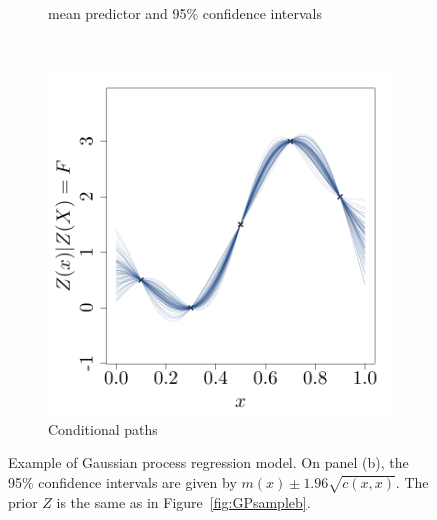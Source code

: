 \documentclass[twoside,openright]{report}
\begin{document}
\begin{figure}[ht!]
\begin{subfigure}[t]{0.3\textwidth}
                \caption{mean predictor and 95\% confidence intervals}
        \end{subfigure}%
        ~ 
        \begin{subfigure}[t]{0.3\textwidth}
                \includegraphics[width=\textwidth]{figures/ch2_GPcond}
                \caption{Conditional paths}
        \end{subfigure}%
        \caption{Example of Gaussian process regression model. On panel (b), the 95\% confidence intervals are given by $m(x) \pm 1.96\sqrt{c(x,x)}$. The prior $Z$ is the same as in Figure~\ref{fig:GPsampleb}.}
        \label{fig:GPR}
\end{figure}
\end{document}
